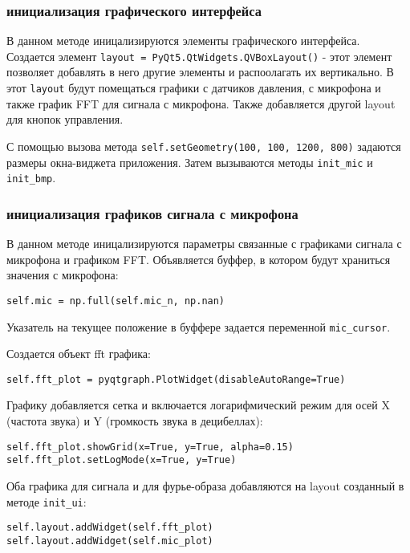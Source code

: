 \documentclass[../main.tex]{subfiles}
\begin{document}
\subsubsection{инициализация графического интерфейса}
В данном методе иницализируются элементы графического интерфейса. Создается элемент \verb|layout = PyQt5.QtWidgets.QVBoxLayout()| - этот элемент позволяет добавлять в него другие элементы и распоолагать их вертикально. В этот \verb|layout| будут помещаться графики с датчиков давления, с микрофона и также график FFT для сигнала с микрофона. Также добавляется другой layout для кнопок управления.

С помощью вызова метода \verb|self.setGeometry(100, 100, 1200, 800)| задаются размеры окна-виджета приложения. Затем вызываются методы \texttt{init\_mic} и \verb|init_bmp|.

\subsubsection{инициализация графиков сигнала с микрофона}
В данном методе иницализируются параметры связанные с графиками сигнала с микрофона и графиком FFT. Объявляется буффер, в котором будут храниться значения с микрофона: 

\begin{lstlisting}
self.mic = np.full(self.mic_n, np.nan)
\end{lstlisting}

Указатель на текущее положение в буффере задается переменной \verb|mic_cursor|.

Создается объект fft графика:
\begin{lstlisting}
self.fft_plot = pyqtgraph.PlotWidget(disableAutoRange=True)
\end{lstlisting}

Графику добавляется сетка и включается логарифмический режим для осей X (частота звука) и Y (громкость звука в децибеллах):

\begin{lstlisting}
self.fft_plot.showGrid(x=True, y=True, alpha=0.15)
self.fft_plot.setLogMode(x=True, y=True)
\end{lstlisting}

Оба графика для сигнала и для фурье-образа добавляются на layout созданный в методе \verb|init_ui|:

\begin{lstlisting}
self.layout.addWidget(self.fft_plot)
self.layout.addWidget(self.mic_plot)
\end{lstlisting}
\end{document}
